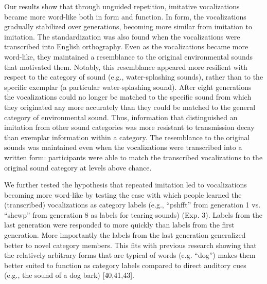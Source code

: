 \documentclass[english,floatsintext,man]{apa6}
\theoremstyle{definition}
\theoremstyle{definition}
\theoremstyle{definition}
\theoremstyle{remark}
\begin{document}
Our results show that through unguided repetition, imitative
vocalizations became more word-like both in form and function. In form,
the vocalizations gradually stabilized over generations, becoming more
similar from imitation to imitation. The standardization was also found
when the vocalizations were transcribed into English orthography. Even
as the vocalizations became more word-like, they maintained a
resemblance to the original environmental sounds that motivated them.
Notably, this resemblance appeared more resilient with respect to the
category of sound (e.g., water-splashing sounds), rather than to the
specific exemplar (a particular water-splashing sound). After eight
generations the vocalizations could no longer be matched to the specific
sound from which they originated any more accurately than they could be
matched to the general category of environmental sound. Thus,
information that distinguished an imitation from other sound categories
was more resistant to transmission decay than exemplar information
within a category. The resemblance to the original sounds was maintained
even when the vocalizations were transcribed into a written form:
participants were able to match the transcribed vocalizations to the
original sound category at levels above chance.

We further tested the hypothesis that repeated imitation led to
vocalizations becoming more word-like by testing the ease with which
people learned the (transcribed) vocalizations as category labels (e.g.,
\enquote{pshfft} from generation 1 vs. \enquote{shewp} from generation 8
as labels for tearing sounds) (Exp. 3). Labels from the last generation
were responded to more quickly than labels from the first generation.
More importantly the labels from the last generation generalized better
to novel category members. This fits with previous research showing that
the relatively arbitrary forms that are typical of words (e.g.
\enquote{dog}) makes them better suited to function as category labels
compared to direct auditory cues (e.g., the sound of a dog bark)
{[}40,41,43{]}.
\end{document}

